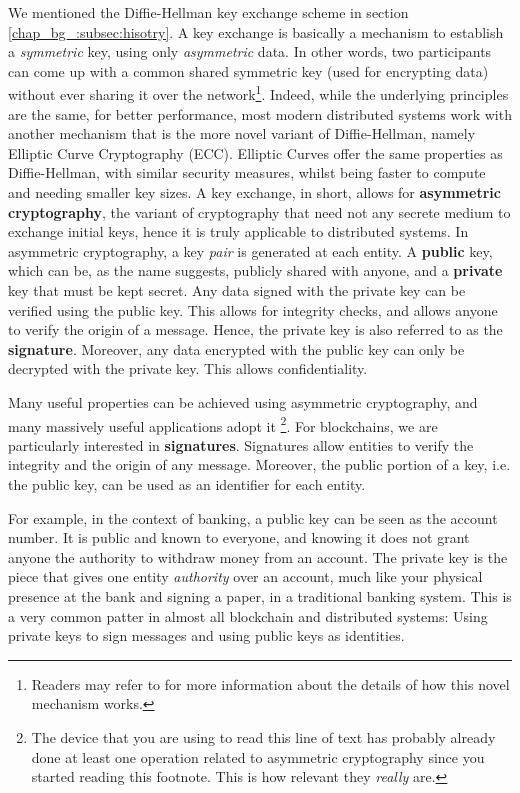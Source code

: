 We mentioned the Diffie-Hellman key exchange scheme in section \ref{chap_bg_:subsec:hisotry}. A key
exchange is basically a mechanism to establish a \textit{symmetric} key, using only
\textit{asymmetric} data. In other words, two participants can come up with a common shared
symmetric key (used for encrypting data) without ever sharing it over the network\footnote{Readers
may refer to \cite{diffieNewDirectionsCryptography1976} for more information about the details of
how this novel mechanism works.}. Indeed, while the underlying principles are the same, for better
performance, most modern distributed systems work with another mechanism that is the more novel
variant of Diffie-Hellman, namely Elliptic Curve Cryptography (ECC). Elliptic Curves offer
the same properties as Diffie-Hellman, with similar security measures, whilst being faster to
compute and needing smaller key sizes. A key exchange, in short, allows for \textbf{asymmetric
cryptography}, the variant of cryptography that need not any secrete medium to exchange initial
keys, hence it is truly applicable to distributed systems. In asymmetric cryptography, a key
\textit{pair} is generated at each entity. A \textbf{public} key, which can be, as the name
suggests, publicly shared with anyone, and a \textbf{private} key that must be kept secret. Any data
signed with the private key can be verified using the public key. This allows for integrity checks,
and allows anyone to verify the origin of a message. Hence, the private key is also referred to as
the \textbf{signature}. Moreover, any data encrypted with the public key can only be decrypted with
the private key. This allows confidentiality.

Many useful properties can be achieved using asymmetric cryptography, and many massively useful
applications adopt it \footnote{The device that you are using to read this line of text has probably
already done at least one operation related to asymmetric cryptography since you started reading
this footnote. This is how relevant they \textit{really} are.}. For blockchains, we are particularly
interested in \textbf{signatures}. Signatures allow entities to verify the integrity and the origin
of any message. Moreover, the public portion of a key, i.e. the public key, can be used as an
identifier for each entity.

For example, in the context of banking, a public key can be seen as the account number. It is public
and known to everyone, and knowing it does not grant anyone the authority to withdraw money from an
account. The private key is the piece that gives one entity \textit{authority} over an account, much
like your physical presence at the bank and signing a paper, in a traditional banking system. This
is a very common patter in almost all blockchain and distributed systems: Using private keys to sign
messages and using public keys as identities.


